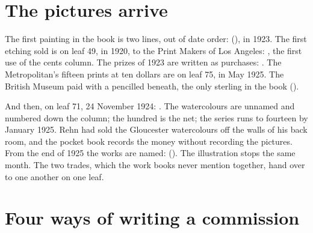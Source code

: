 \section{The pictures arrive}

The first painting in the book is two lines, out of date order:  (), in 1923. The first etching sold is on leaf 49, in 1920, to the Print Makers of Los Angeles: , the first use of the cents column. The prizes of 1923 are written as purchases: . The Metropolitan's fifteen prints at ten dollars are on leaf 75, in May 1925. The British Museum paid  with a pencilled  beneath, the only sterling in the book ().

And then, on leaf 71, 24 November 1924: . The watercolours are unnamed and numbered down the column; the hundred is the net; the series runs to fourteen by January 1925. Rehn had sold the Gloucester watercolours off the walls of his back room, and the pocket book records the money without recording the pictures. From the end of 1925 the works are named:  (). The illustration stops the same month. The two trades, which the work books never mention together, hand over to one another on one leaf.

\section{Four ways of writing a commission}

